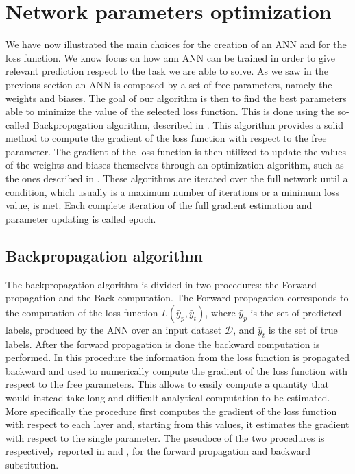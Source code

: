 
\section{Network parameters optimization}\label{weightoptimization}

We have now illustrated the main choices for the creation of an ANN and for the loss function. We know focus on how ann ANN can be trained in order to give relevant prediction respect to the task we are able to solve. 
As we saw in the previous section an ANN is composed by a set of free parameters, namely the weights and biases. The goal of our algorithm is then to find the best parameters able to minimize the value of the selected loss function. This is done using the so-called Backpropagation algorithm\cite{backprop}, described in . This algorithm provides a solid method to compute the gradient of the loss function with respect to the free parameter. The gradient of the loss function is then utilized to update the values of the weights and biases themselves through an optimization algorithm, such as the ones described in .
These algorithms are iterated over the full network until a condition, which usually is a maximum number of iterations or a minimum loss value, is met. Each complete iteration of the full gradient estimation and parameter updating is called epoch.

\subsection{Backpropagation algorithm}\label{backprop}

The backpropagation algorithm is divided in two procedures: the Forward propagation and the Back computation.
The Forward propagation corresponds to the computation of the loss function $L(\bar{y}_p, \bar{y}_t)$, where $\bar{y}_p$ is the set of predicted labels, produced by the ANN over an input dataset $\mathcal{D}$, and $\bar{y}_t$ is the set of true labels. 
After the forward propagation is done the backward computation is performed. In this procedure the information from the loss function is propagated backward and used to numerically compute the gradient of the loss function with respect to the free parameters. This allows to easily compute a quantity that would instead take long and difficult analytical computation to be estimated.
More specifically the procedure first computes the gradient of the loss function with respect to each layer and, starting from this values, it estimates the gradient with respect to the single parameter.
The pseudoce of the two procedures is respectively reported  in  and , for the forward propagation and backward substitution. 

